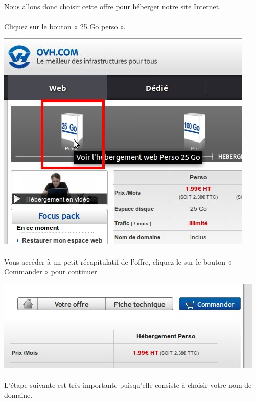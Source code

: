 \documentclass[10pt,a4paper]{article}
\begin{document}
\paragraph{}Nous allons donc choisir cette offre pour héberger notre site Internet.
\paragraph{}Cliquez sur le bouton « 25 Go perso ».
\begin{center}
\includegraphics[scale=0.3]{img/0272.png}
\end{center}
\paragraph{}Vous accéder à un petit récapitulatif de l'offre, cliquez le sur le bouton « Commander » pour continuer.
\begin{center}
\includegraphics[scale=0.3]{img/0273.png}
\end{center}
\paragraph{}L'étape suivante est très importante puisqu'elle consiste à choisir votre nom de domaine.
\end{document}
